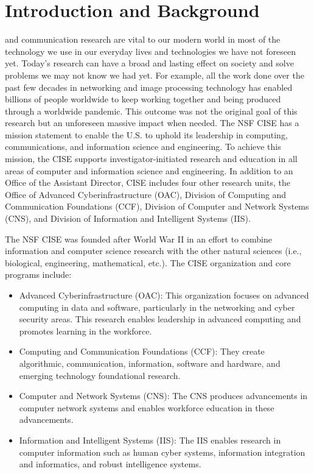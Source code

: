 \documentclass[journal,onecolumn]{IEEEtran}
\begin{document}
\IEEEpeerreviewmaketitle

\section{Introduction and Background}

 and communication research are vital to our modern world in most of the technology we use in our everyday lives and technologies we have not foreseen yet. Today's research can have a broad and lasting effect on society and solve problems we may not know we had yet. For example, all the work done over the past few decades in networking and image processing technology has enabled billions of people worldwide to keep working together and being produced through a worldwide pandemic. This outcome was not the original goal of this research but an unforeseen massive impact when needed. The NSF CISE has a mission statement to enable the U.S. to uphold its leadership in computing, communications, and information science and engineering. To achieve this mission, the CISE supports investigator-initiated research and education in all areas of computer and information science and engineering. In addition to an Office of the Assistant Director, CISE includes four other research units, the Office of Advanced Cyberinfrastructure (OAC), Division of Computing and Communication Foundations (CCF), Division of Computer and Network Systems (CNS), and Division of Information and Intelligent Systems (IIS).

The NSF CISE was founded after World War II in an effort to combine information and computer science research with the other natural sciences (i.e., biological, engineering, mathematical, etc.). The CISE organization and core programs include:

\begin{itemize}
  \item Advanced Cyberinfrastructure (OAC): This organization focuses on advanced computing in data and software, particularly in the networking and cyber security areas. This research enables leadership in advanced computing and promotes learning in the workforce. 
  \item Computing and Communication Foundations (CCF): They create algorithmic, communication, information, software and hardware, and emerging technology foundational research.
  \item Computer and Network Systems (CNS): The CNS produces advancements in computer network systems and enables workforce education in these advancements. 
  \item Information and Intelligent Systems (IIS): The IIS enables research in computer information such as human cyber systems, information integration and informatics, and robust intelligence systems.
\end{itemize}
\end{document}
